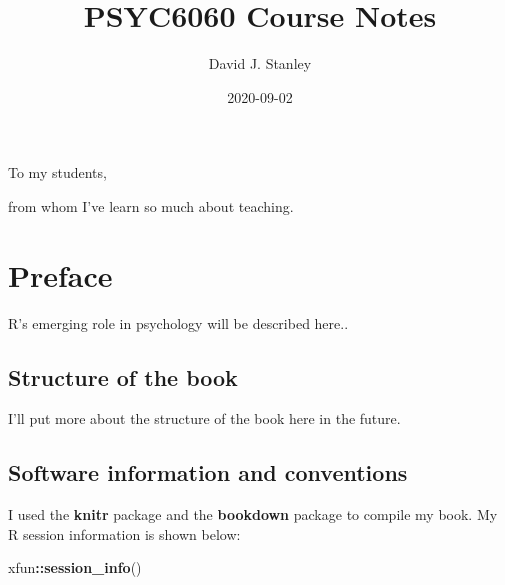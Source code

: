 \documentclass[
]{krantz}
\title{PSYC6060 Course Notes}
\author{David J. Stanley}
\date{2020-09-02}
\makeatletter
\newenvironment{Shaded}{\begin{snugshade}}{\end{snugshade}}
\newcommand{\KeywordTok}[1]{\textcolor[rgb]{0.27,0.27,0.27}{\textbf{#1}}}
\newcommand{\NormalTok}[1]{#1}
\newcommand{\OperatorTok}[1]{\textcolor[rgb]{0.43,0.43,0.43}{\textbf{#1}}}
\newenvironment{kframe}{%
\medskip{}
\setlength{\fboxsep}{.8em}
 \def\at@end@of@kframe{}%
 \ifinner\ifhmode%
  \def\at@end@of@kframe{\end{minipage}}%
  \begin{minipage}{\columnwidth}%
 \fi\fi%
 \def\FrameCommand##1{\hskip\@totalleftmargin \hskip-\fboxsep
 \colorbox{shadecolor}{##1}\hskip-\fboxsep
     \hskip-\linewidth \hskip-\@totalleftmargin \hskip\columnwidth}%
 \MakeFramed {\advance\hsize-\width
   \@totalleftmargin\z@ \linewidth\hsize
   \@setminipage}}%
 {\par\unskip\endMakeFramed%
 \at@end@of@kframe}
\renewenvironment{Shaded}{\begin{kframe}}{\end{kframe}}
\makeatother
\begin{document}
\maketitle


\thispagestyle{empty}

\begin{center}
To my students,

from whom I've learn so much about teaching.
\end{center}

\setlength{\abovedisplayskip}{-5pt}
\setlength{\abovedisplayshortskip}{-5pt}

{
\hypersetup{linkcolor=}
\setcounter{tocdepth}{2}
\tableofcontents
}
\listoftables
\listoffigures
\hypertarget{preface}{%
\chapter*{Preface}\label{preface}}


R's emerging role in psychology will be described here..

\hypertarget{structure-of-the-book}{%
\section*{Structure of the book}\label{structure-of-the-book}}


I'll put more about the structure of the book here in the future.

\hypertarget{software-information-and-conventions}{%
\section*{Software information and conventions}\label{software-information-and-conventions}}


I used the \textbf{knitr} package \citep{xie2015} and the \textbf{bookdown} package \citep{R-bookdown} to compile my book. My R session information is shown below:

\begin{Shaded}
\begin{Highlighting}[]
\NormalTok{xfun}\OperatorTok{::}\KeywordTok{session_info}\NormalTok{()}
\end{Highlighting}
\end{Shaded}
\end{document}

